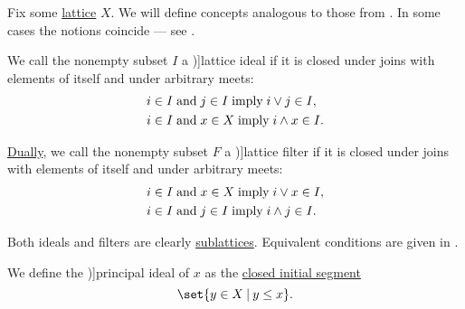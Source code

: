 \begin{definition}\label{def:lattice_ideal}
  Fix some \hyperref[def:lattice]{lattice} \( X \). We will define concepts analogous to those from . In some cases the notions coincide --- see .

  \begin{paracol}{2}
    \begin{leftcolumn}
      We call the nonempty subset \( I \) a \term[ru=решёточный идеал (\cite[def. 4.5]{Гуров2013Решётки})]{lattice ideal} if it is closed under joins with elements of itself and under arbitrary meets:
      \small
      \begin{align}
        &i \in I \T{and} j \in I \T{imply} i \vee j \in I, \label{eq:def:lattice_ideal/lattice_join} \\
        &i \in I \T{and} x \in X \T{imply} i \wedge x \in I. \label{eq:def:lattice_ideal/lattice_meet}
      \end{align}
      \normalsize
    \end{leftcolumn}

    \begin{rightcolumn}
      \hyperref[thm:lattice_duality]{Dually}, we call the nonempty subset \( F \) a \term[ru=решёточный фильтр (\cite[def. 4.5]{Гуров2013Решётки})]{lattice filter} if it is closed under joins with elements of itself and under arbitrary meets:
      \small
      \begin{align}
        &i \in I \T{and} x \in X \T{imply} i \vee x \in I, \label{eq:def:lattice_ideal/filter_join} \\
        &i \in I \T{and} j \in I \T{imply} i \wedge j \in I. \label{eq:def:lattice_ideal/filter_meet}
      \end{align}
      \normalsize
    \end{rightcolumn}
  \end{paracol}

  Both ideals and filters are clearly \hyperref[def:lattice/submodel]{sublattices}. Equivalent conditions are given in .

  \begin{thmenum}
    \begin{paracol}{2}
      \begin{leftcolumn}
        We define the \term[ru=главный (идеал) (\cite[140]{Гуров2013Решётки})]{principal ideal} of \( x \) as the \hyperref[def:order_interval/unbounded]{closed initial segment}
        \begin{equation*}
          \set{ y \in X \given y \leq x }.
        \end{equation*}
      \end{leftcolumn}


\end{paracol}
\end{thmenum}
\end{definition}
